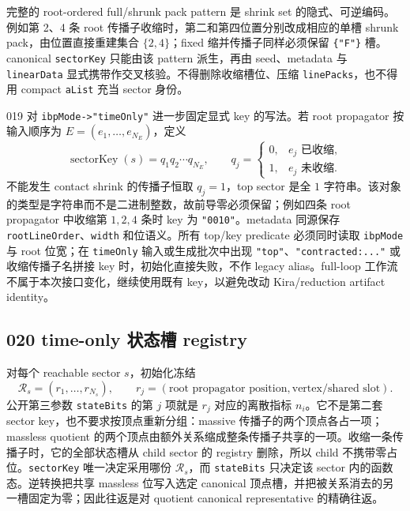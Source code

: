 ﻿\documentclass[a4paper,11pt]{article}
\begin{document}
完整的 root-ordered full/shrunk pack pattern 是 shrink set 的隐式、可逆编码。例如第 2、4 条 root 传播子收缩时，第二和第四位置分别改成相应的单槽 shrunk pack，由位置直接重建集合 $\{2,4\}$；fixed 缩并传播子同样必须保留 \texttt{\{"F"\}} 槽。canonical \texttt{sectorKey} 只能由该 pattern 派生，再由 seed、metadata 与 \texttt{linearData} 显式携带作交叉核验。不得删除收缩槽位、压缩 \texttt{linePacks}，也不得用 compact \texttt{aList} 充当 sector 身份。

019 对 \texttt{ibpMode->"timeOnly"} 进一步固定显式 key 的写法。若 root propagator 按输入顺序为
$E=(e_1,\ldots,e_{N_E})$，定义
\begin{equation}
 \operatorname{sectorKey}(s)=q_1q_2\cdots q_{N_E},\qquad
 q_j=\begin{cases}
 0,&e_j\text{ 已收缩},\\
 1,&e_j\text{ 未收缩}.
 \end{cases}
 \label{v019TimeOnlySectorBitKey}
\end{equation}
不能发生 contact shrink 的传播子恒取 $q_j=1$，top sector 是全 $1$ 字符串。该对象的类型是字符串而不是二进制整数，故前导零必须保留；例如四条 root propagator 中收缩第 $1,2,4$ 条时 key 为 \texttt{"0010"}。metadata 同源保存 \texttt{rootLineOrder}、\texttt{width} 和位语义。所有 top/key predicate 必须同时读取 \texttt{ibpMode} 与 root 位宽；在 \texttt{timeOnly} 输入或生成批次中出现 \texttt{"top"}、\texttt{"contracted:..."} 或收缩传播子名拼接 key 时，初始化直接失败，不作 legacy alias。full-loop 工作流不属于本次接口变化，继续使用既有 key，以避免改动 Kira/reduction artifact identity。

\subsection{020 time-only 状态槽 registry}

对每个 reachable sector $s$，初始化冻结
\begin{equation}
 \mathcal R_s=(r_1,\ldots,r_{N_s}),\qquad
 r_j=(\text{root propagator position},\text{vertex/shared slot}).
 \label{v020TimeOnlyStateRegistry}
\end{equation}
公开第三参数 \texttt{stateBits} 的第 $j$ 项就是 $r_j$ 对应的离散指标 $n_i$。它不是第二套 sector key，也不要求按顶点重新分组：massive 传播子的两个顶点各占一项；massless quotient 的两个顶点由额外关系缩成整条传播子共享的一项。收缩一条传播子时，它的全部状态槽从 child sector 的 registry 删除，所以 child 不携带零占位。\texttt{sectorKey} 唯一决定采用哪份 $\mathcal R_s$，而 \texttt{stateBits} 只决定该 sector 内的函数态。逆转换把共享 massless 位写入选定 canonical 顶点槽，并把被关系消去的另一槽固定为零；因此往返是对 quotient canonical representative 的精确往返。
\end{document}
